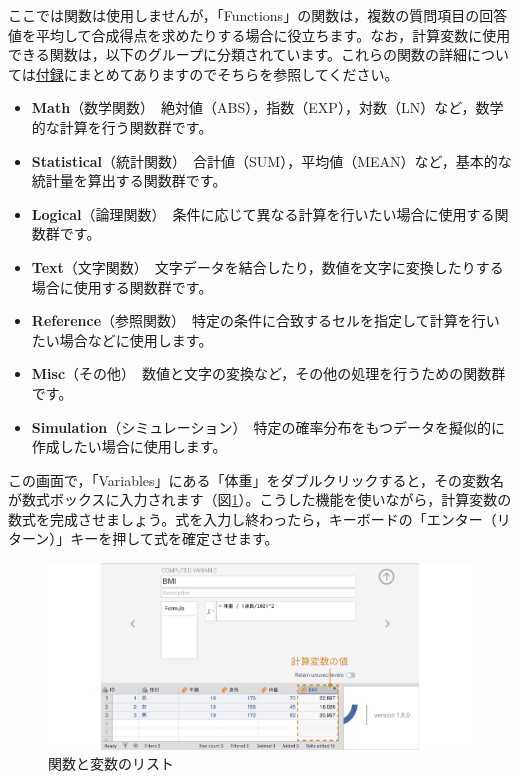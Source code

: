 \documentclass[
  12pt,
  a5jpaper,
  lualatex, ja=standard]{bxjsbook}
\providecommand{\tightlist}{%
  \setlength{\itemsep}{0pt}\setlength{\parskip}{0pt}}
\newenvironment{jmvfunctions}{%
	\begin{center}%
	\begin{tcolorbox}[%
		title=関数一覧,
		colframe=gmoji,
		colbacktitle=gmoji,
		colback=gmoji!2!white,
		breakable,
		width=.9\textwidth,
		]\small\addtolength{\leftmargini}{-3\labelsep}%
	}%
	{\end{tcolorbox}\end{center}}
\begin{document}
ここでは関数は使用しませんが，「Functions」の関数は，複数の質問項目の回答値を平均して合成得点を求めたりする場合に役立ちます。なお，計算変数に使用できる関数は，以下のグループに分類されています。これらの関数の詳細については\protect\hyperlink{ch:appendix}{付録}にまとめてありますのでそちらを参照してください。

\begin{jmvfunctions}

\begin{itemize}
\tightlist
\item
  \textbf{Math}（数学関数）　絶対値（ABS），指数（EXP），対数（LN）など，数学的な計算を行う関数群です。
\item
  \textbf{Statistical}（統計関数）　合計値（SUM），平均値（MEAN）など，基本的な統計量を算出する関数群です。
\item
  \textbf{Logical}（論理関数）　条件に応じて異なる計算を行いたい場合に使用する関数群です。
\item
  \textbf{Text}（文字関数）　文字データを結合したり，数値を文字に変換したりする場合に使用する関数群です。
\item
  \textbf{Reference}（参照関数）　特定の条件に合致するセルを指定して計算を行いたい場合などに使用します。
\item
  \textbf{Misc}（その他）　数値と文字の変換など，その他の処理を行うための関数群です。
\item
  \textbf{Simulation}（シミュレーション）　特定の確率分布をもつデータを擬似的に作成したい場合に使用します。
\end{itemize}

\end{jmvfunctions}

この画面で，「Variables」にある「体重」をダブルクリックすると，その変数名が数式ボックスに入力されます（図\ref{fig:data-sample-data-computed}）。こうした機能を使いながら，計算変数の数式を完成させましょう。式を入力し終わったら，キーボードの「エンター（リターン）」キーを押して式を確定させます。

\begin{figure}[!ht]

{\centering \includegraphics[width=1\linewidth]{images/basics/data-sample-data-computed} 

}

\caption{関数と変数のリスト}\label{fig:data-sample-data-computed}
\end{figure}
\end{document}
